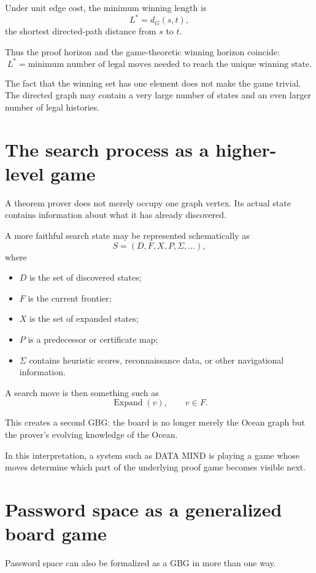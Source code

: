 \documentclass[11pt]{article}
\begin{document}
Under unit edge cost, the minimum winning length is
\[
L^*=d_G(s,t),
\]
the shortest directed-path distance from \(s\) to \(t\).

Thus the proof horizon and the game-theoretic winning horizon coincide:
\[
\boxed{
L^*
=
\text{minimum number of legal moves needed to reach the unique winning state}.
}
\]

The fact that the winning set has one element does not make the game trivial.
The directed graph may contain a very large number of states and an even larger
number of legal histories.

\section{The search process as a higher-level game}

A theorem prover does not merely occupy one graph vertex. Its actual state
contains information about what it has already discovered.

A more faithful search state may be represented schematically as
\[
S=
(D,F,X,P,\Sigma,\ldots),
\]
where
\begin{itemize}[leftmargin=2em]
    \item \(D\) is the set of discovered states;
    \item \(F\) is the current frontier;
    \item \(X\) is the set of expanded states;
    \item \(P\) is a predecessor or certificate map;
    \item \(\Sigma\) contains heuristic scores, reconnaissance data, or other
    navigational information.
\end{itemize}

A search move is then something such as
\[
\operatorname{Expand}(v),
\qquad v\in F.
\]

This creates a second GBG: the board is no longer merely the Ocean graph but
the prover's evolving knowledge of the Ocean.

In this interpretation, a system such as DATA MIND is playing a game whose
moves determine which part of the underlying proof game becomes visible next.

\section{Password space as a generalized board game}

Password space can also be formalized as a GBG in more than one way.
\end{document}

